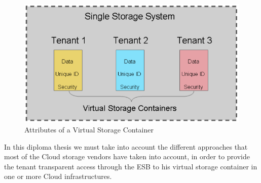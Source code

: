 \begin{figure}[htb]
	\centering
		\includegraphics[clip, scale=0.4]{./gfx/virtualstoragecontainer.png}
	\caption[Virtual Storage Container]{Attributes of a Virtual Storage Container \cite{feresten2010}}
	\label{fig:virtualstoragecontainer}
\end{figure}

In this diploma thesis we must take into account the different approaches that most of the Cloud storage vendors have taken into account, in order to provide the tenant transparent access through the \ac{ESB} to his virtual storage container in one or more Cloud infrastructures.